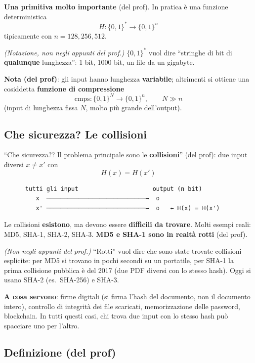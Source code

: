 \textbf{Una primitiva molto importante} (del prof). In pratica è una funzione deterministica
\[
H : \{0,1\}^* \to \{0,1\}^n
\]
tipicamente con \(n = 128, 256, 512\).

\emph{(Notazione, non negli appunti del prof.)} \(\{0,1\}^*\) vuol dire ``stringhe di bit di \textbf{qualunque} lunghezza'': 1 bit, 1000 bit, un file da un gigabyte.

\textbf{Nota (del prof)}: gli input hanno lunghezza \textbf{variabile}; altrimenti si ottiene una cosiddetta \textbf{funzione di compressione}
\[
\text{cmps} : \{0,1\}^N \to \{0,1\}^n, \qquad N \gg n
\]
(input di lunghezza fissa \(N\), molto più grande dell'output).

\subsection{Che sicurezza? Le collisioni}

``Che sicurezza?? Il problema principale sono le \textbf{collisioni}'' (del prof): due input diversi \(x \ne x'\) con
\[
H(x) = H(x')
\]

\begin{verbatim}
      tutti gli input                     output (n bit)
         x  ────────────────────────────→  o
         x' ────────────────────────────→  o   ← H(x) = H(x')
\end{verbatim}

Le collisioni \textbf{esistono}, ma devono essere \textbf{difficili da trovare}. Molti esempi reali: MD5, SHA-1, SHA-2, SHA-3. \textbf{MD5 e SHA-1 sono in realtà rotti} (del prof).

\begin{nota}
\emph{(Non negli appunti del prof.)} ``Rotti'' vuol dire che sono state trovate collisioni esplicite: per MD5 si trovano in pochi secondi su un portatile, per SHA-1 la prima collisione pubblica è del 2017 (due PDF diversi con lo stesso hash). Oggi si usano SHA-2 (es.\ SHA-256) e SHA-3.

\textbf{A cosa servono}: firme digitali (si firma l'hash del documento, non il documento intero), controllo di integrità dei file scaricati, memorizzazione delle password, blockchain. In tutti questi casi, chi trova due input con lo stesso hash può spacciare uno per l'altro.
\end{nota}

\subsection{Definizione (del prof)}

